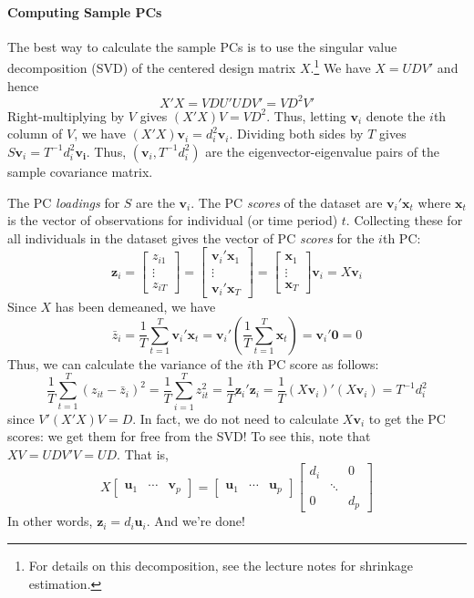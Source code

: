 \paragraph{Computing Sample PCs} 
The best way to calculate the sample PCs is to use the singular value decomposition (SVD) of the centered design matrix $X$.\footnote{For details on this decomposition, see the lecture notes for shrinkage estimation.} We have $X = UDV'$ and hence 
$$X'X = VDU'UDV' = VD^2V'$$
Right-multiplying by $V$ gives $(X'X)V = VD^2$. Thus, letting $\mathbf{v}_i$ denote the $i$th column of $V$, we have $(X'X)\mathbf{v}_i = d_i^2 \mathbf{v}_i$. Dividing both sides by $T$ gives $S \mathbf{v}_i = T^{-1}d_i^2\mathbf{v_i}$. Thus, $(\mathbf{v}_i, T^{-1}d_i^2)$ are the eigenvector-eigenvalue pairs of the sample covariance matrix. 

The PC \emph{loadings} for $S$ are the $\mathbf{v}_i$. The PC \emph{scores} of the dataset are $\mathbf{v}_i' \mathbf{x}_t$ where $\mathbf{x}_t$ is the vector of observations for individual (or time period) $t$. Collecting these for all individuals in the dataset gives the vector of PC \emph{scores} for the $i$th PC:
 $$\textbf{z}_i = \left[ \begin{array}
 	{cc} z_{i1} \\ \vdots \\ z_{iT}
 \end{array}\right] =\left[\begin{array}
 	{cc} \textbf{v}_i' \textbf{x}_1 \\ \vdots \\ \textbf{v}_i' \textbf{x}_T  
 \end{array} \right] = \left[\begin{array}
 	{cc}  \textbf{x}_1 \\ \vdots \\  \textbf{x}_T  
 \end{array} \right]\textbf{v}_i = X \textbf{v}_i$$
Since $X$ has been demeaned, we have
	$$\bar{z}_i = \frac{1}{T} \sum_{t=1}^T\textbf{v}_i' \textbf{x}_t =\textbf{v}_i' \left( \frac{1}{T} \sum_{t=1}^T \textbf{x}_t\right) = \textbf{v}_i' \textbf{0} = 0$$
Thus, we can calculate the variance of the $i$th PC score as follows:
	$$\frac{1}{T}\sum_{t=1}^T (z_{it} - \bar{z}_i)^2 = \frac{1}{T}\sum_{i=1}^T z_{it}^2 = \frac{1}{T} \textbf{z}_i' \textbf{z}_i = \frac{1}{T} (X \textbf{v}_i)'(X \textbf{v}_i) = T^{-1}d_i^2$$
since $V'(X'X)V = D$. In fact, we do not need to calculate $X \mathbf{v}_i$ to get the PC scores: we get them for free from the SVD! To see this, note that $XV = UDV'V = UD$. That is,
	$$X\left[ \begin{array}
		{ccc} \textbf{u}_1 & \cdots & \textbf{v}_p
	\end{array}\right]= \left[ \begin{array}
		{ccc} \textbf{u}_1 & \cdots & \textbf{u}_p
	\end{array}\right] \left[\begin{array}
		{ccc} d_i & &0 \\
		& \ddots &\\
		0& & d_p
	\end{array} \right]$$
In other words, $\mathbf{z}_i = d_i \mathbf{u}_i$. And we're done!

